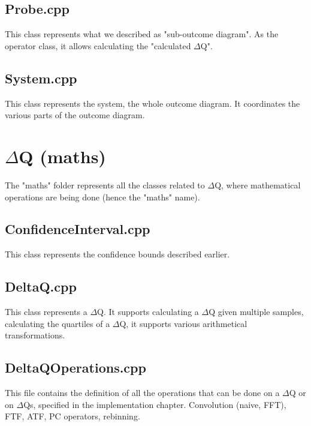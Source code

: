 \subsection{Probe.cpp} \label{code:probe}
This class represents what we described as "sub-outcome diagram". As the operator class, it allows calculating the "calculated $\Delta$Q".


\subsection{System.cpp} \label{code:sys}
This class represents the system, the whole outcome diagram. It coordinates the various parts of the outcome diagram.


\section{$\Delta$Q (maths)}
The "maths" folder represents all the classes related to $\Delta$Q, where mathematical operations are being done (hence the "maths" name).

\subsection{ConfidenceInterval.cpp} \label{code:ci}
This class represents the confidence bounds described earlier.


\subsection{DeltaQ.cpp} \label{code:dq}
This class represents a $\Delta$Q. It supports calculating a $\Delta$Q given multiple samples, calculating the quartiles of a $\Delta$Q, it supports various arithmetical transformations.


\subsection{DeltaQOperations.cpp} \label{code:dqop}
This file contains the definition of all the operations that can be done on a $\Delta$Q or on $\Delta$Qs, specified in the implementation chapter. Convolution (naive, FFT), FTF, ATF, PC operators, rebinning.


